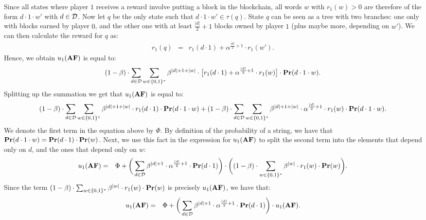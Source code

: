 Since all states where player $1$ receives a reward involve putting a block in the blockchain, all words 
$w$ with $r_1(w) > 0$ are therefore of the form $d\cdot 1\cdot w'$ with $d \in \mathcal{D}$. Now let $q$ be the only state such that  $d\cdot 1\cdot w' \in \tau(q)$.
State $q$ can be seen as a tree with two branches: one only with blocks earned by player $0$, and the other one 
with at least ${\frac{|d|}{2}+1}$ blocks owned by player $1$ (plus maybe more, depending on $w'$). 
We can then calculate the reward for $q$ as: 
\begin{eqnarray*}
r_1(q) & = & r_1(d \cdot 1) + \alpha^{\frac{|d|}{2}+1}\cdot r_1(w').
\end{eqnarray*}
Hence, we obtain $u_1(\text{\rm {\bf AF}})$ is equal to:
\begin{eqnarray*}
 (1-\beta)\cdot\sum_{d\in \mathcal{D}}  \sum_{w\in \{0,1\}^*}\beta^{|d|+1+|w|}\cdot \big[r_1(d\cdot 1) + \alpha^{\frac{|d|}{2}+1}\cdot r_1(w)\big] \cdot \mathbf{Pr}(d\cdot 1 \cdot w).
\end{eqnarray*}
%
Splitting up the summation we get that $ u_1(\text{\rm {\bf AF}})$ is equal to:
\begin{eqnarray*}
(1-\beta)\cdot \sum_{d\in \mathcal{D}}  \sum_{w\in \{0,1\}^*}\beta^{|d|+1+|w|}\cdot r_1(d\cdot 1) \cdot \mathbf{Pr}(d\cdot 1\cdot w) +
 (1-\beta)\cdot \sum_{d\in \mathcal{D}}  \sum_{w\in \{0,1\}^*}\beta^{|d|+1+|w|}\cdot  \alpha^{\frac{|d|}{2}+1}\cdot r_1(w) \cdot \mathbf{Pr}(d\cdot 1 \cdot w).
\end{eqnarray*}
%
We denote the first term in the equation above by $\Phi$. 
By definition of the probability of a string, we have that $\mathbf{Pr}(d\cdot 1\cdot w) = \mathbf{Pr}(d\cdot 1)\cdot \mathbf{Pr}(w)$. 
Next, we use this fact in the expression for $u_1(\text{\rm {\bf AF}})$ to split the second term into the elements that depend only on $d$, and the ones that depend only on $w$:
%
\begin{eqnarray*}
 u_1(\text{\rm {\bf AF}}) & = & \Phi  + 
  \bigg(\sum_{d\in \mathcal{D}} \beta^{|d|+1}\cdot  \alpha^{\frac{|d|}{2}+1}\cdot \mathbf{Pr}(d\cdot 1)\bigg) \cdot 
 \bigg((1-\beta)\cdot\sum_{w\in \{0,1\}^*} \beta^{|w|} \cdot r_1(w)  \cdot \mathbf{Pr}(w)\bigg).
\end{eqnarray*}
%
Since the term $(1-\beta)\cdot\sum_{w\in \{0,1\}^*} \beta^{|w|} \cdot r_1(w)  \cdot \mathbf{Pr}(w)$ is precisely $u_1(\text{\rm {\bf AF}})$, we have that:
%
\begin{eqnarray*}
 u_1(\text{\rm {\bf AF}}) & = & \Phi + 
 \bigg(\sum_{d\in \mathcal{D}} \beta^{|d|+1}\cdot  \alpha^{\frac{|d|}{2}+1}\cdot \mathbf{Pr}(d\cdot 1)\bigg) \cdot  u_1(\text{\rm {\bf AF}}).
\end{eqnarray*}
